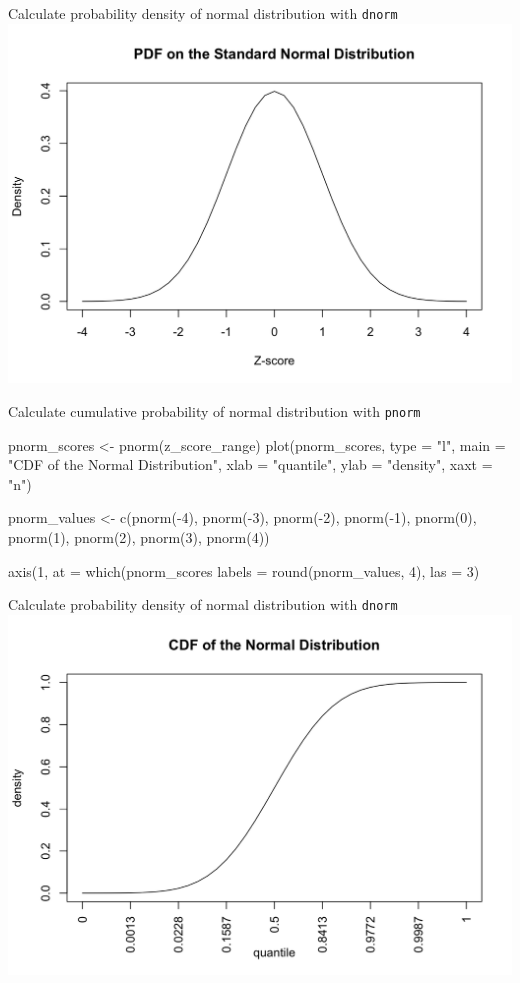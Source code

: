 \documentclass[12pt, t, xcolor=dvipsnames]{beamer}
\newcommand{\code}[1]{\colorbox{codegray}{\textcolor{black!95}{\texttt{#1}}}}
\begin{document}
\begin{frame}{Calculate probability density of normal distribution with \code{dnorm}}
\includegraphics[width=\textwidth, height=\textheight, keepaspectratio]{dnorm}
\end{frame}


\begin{frame}[fragile]{Calculate cumulative probability of normal distribution with \code{pnorm}}
\begin{Rcode}
pnorm_scores <- pnorm(z_score_range)
plot(pnorm_scores, type = "l", 
     main = "CDF of the Normal Distribution", 
     xlab = "quantile", ylab = "density", xaxt = "n")

pnorm_values <- c(pnorm(-4), pnorm(-3), pnorm(-2), 
                  pnorm(-1), pnorm(0), pnorm(1), 
                  pnorm(2), pnorm(3), pnorm(4))

axis(1, at = which(pnorm_scores %
     labels = round(pnorm_values, 4), las = 3)
\end{Rcode}
\end{frame}

\begin{frame}{Calculate probability density of normal distribution with \code{dnorm}}
\includegraphics[width=\textwidth, height=\textheight, keepaspectratio]{pnorm}
\end{frame}
\end{document}
